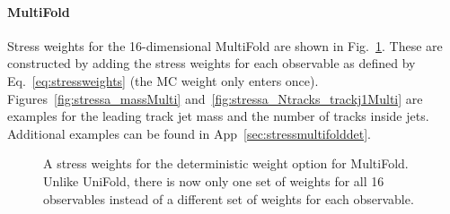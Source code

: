 \clearpage

\paragraph{MultiFold} Stress weights for the 16-dimensional MultiFold are shown in Fig.~\ref{fig:stressa_weightsMulti}.  These are constructed by adding the stress weights for each observable as defined by Eq.~\ref{eq:stressweights} (the MC weight only enters once).  Figures~\ref{fig:stressa_massMulti} and~\ref{fig:stressa_Ntracks_trackj1Multi} are examples for the leading track jet mass and the number of tracks inside jets.  Additional examples can be found in App~\ref{sec:stressmultifolddet}.

\begin{figure}[h!]
\centering
{}
\caption{A stress weights for the deterministic weight option for MultiFold.  Unlike UniFold, there is now only one set of weights for all 16 observables instead of a different set of weights for each observable.}
\label{fig:stressa_weightsMulti}
\end{figure}

